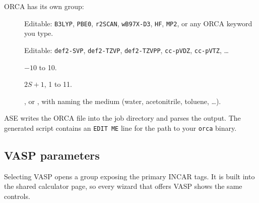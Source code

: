 ORCA has its own group:

\begin{description}
  \item[] Editable: \texttt{B3LYP}, \texttt{PBE0},
    \texttt{r2SCAN}, \texttt{wB97X-D3}, \texttt{HF}, \texttt{MP2}, or any
    ORCA keyword you type.
  \item[] Editable: \texttt{def2-SVP}, \texttt{def2-TZVP},
    \texttt{def2-TZVPP}, \texttt{cc-pVDZ}, \texttt{cc-pVTZ}, \ldots
  \item[] $-10$ to 10.
  \item[] $2S+1$, 1 to 11.
  \item[] ,  or , with
     naming the medium (water, acetonitrile, toluene, \ldots).
\end{description}

ASE writes the ORCA  file into the job directory and parses the
output. The generated script contains an \texttt{EDIT ME} line for the path
to your \texttt{orca} binary.

\subsection{VASP parameters}
\label{sec:vaspsettings}

Selecting VASP opens a  group exposing the primary INCAR
tags. It is built into the shared calculator page, so every wizard that offers
VASP shows the same controls.

